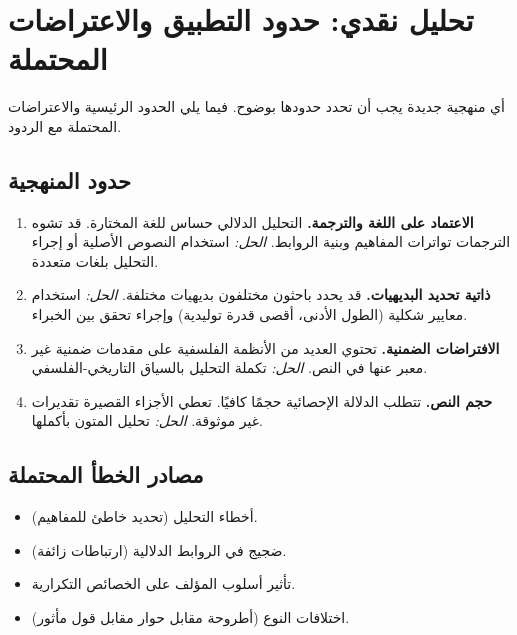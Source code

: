 \documentclass[11pt,a4paper]{article}
\begin{document}
	
	\section{تحليل نقدي: حدود التطبيق والاعتراضات المحتملة}
	\label{sec:critical-analysis}
	
	أي منهجية جديدة يجب أن تحدد حدودها بوضوح. فيما يلي الحدود الرئيسية والاعتراضات المحتملة مع الردود.
	
	\subsection{حدود المنهجية}
	
	\begin{enumerate}
		\item \textbf{الاعتماد على اللغة والترجمة.} التحليل الدلالي حساس للغة المختارة. قد تشوه الترجمات تواترات المفاهيم وبنية الروابط. \textit{الحل:} استخدام النصوص الأصلية أو إجراء التحليل بلغات متعددة.
		\item \textbf{ذاتية تحديد البديهيات.} قد يحدد باحثون مختلفون بديهيات مختلفة. \textit{الحل:} استخدام معايير شكلية (الطول الأدنى، أقصى قدرة توليدية) وإجراء تحقق بين الخبراء.
		\item \textbf{الافتراضات الضمنية.} تحتوي العديد من الأنظمة الفلسفية على مقدمات ضمنية غير معبر عنها في النص. \textit{الحل:} تكملة التحليل بالسياق التاريخي-الفلسفي.
		\item \textbf{حجم النص.} تتطلب الدلالة الإحصائية حجمًا كافيًا. تعطي الأجزاء القصيرة تقديرات غير موثوقة. \textit{الحل:} تحليل المتون بأكملها.
	\end{enumerate}
	
	\subsection{مصادر الخطأ المحتملة}
	
	\begin{itemize}
		\item أخطاء التحليل (تحديد خاطئ للمفاهيم).
		\item ضجيج في الروابط الدلالية (ارتباطات زائفة).
		\item تأثير أسلوب المؤلف على الخصائص التكرارية.
		\item اختلافات النوع (أطروحة مقابل حوار مقابل قول مأثور).
	\end{itemize}
	
\end{document}
